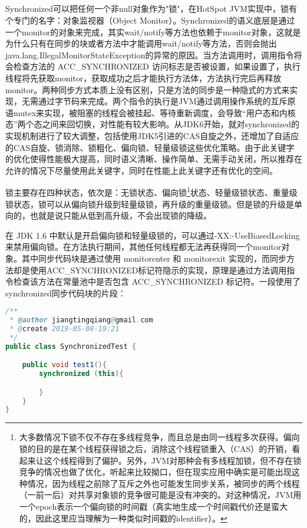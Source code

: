 \documentclass[../../../interview-questions.tex]{subfiles}
\begin{document}
\subsection{\color{red}{synchronized的实现原理是什么}}

Synchronized可以把任何一个非null对象作为"锁"，在HotSpot JVM实现中，锁有个专门的名字：对象监视器（Object Monitor）。Synchronized的语义底层是通过一个monitor的对象来完成，其实wait/notify等方法也依赖于monitor对象，这就是为什么只有在同步的块或者方法中才能调用wait/notify等方法，否则会抛出java.lang.IllegalMonitorStateException的异常的原因。当方法调用时，调用指令将会检查方法的 ACC\_SYNCHRONIZED 访问标志是否被设置，如果设置了，执行线程将先获取monitor，获取成功之后才能执行方法体，方法执行完后再释放monitor。两种同步方式本质上没有区别，只是方法的同步是一种隐式的方式来实现，无需通过字节码来完成。两个指令的执行是JVM通过调用操作系统的互斥原语mutex来实现，被阻塞的线程会被挂起、等待重新调度，会导致“用户态和内核态”两个态之间来回切换，对性能有较大影响。从JDK6开始，就对synchronized的实现机制进行了较大调整，包括使用JDK5引进的CAS自旋之外，还增加了自适应的CAS自旋、锁消除、锁粗化、偏向锁、轻量级锁这些优化策略。由于此关键字的优化使得性能极大提高，同时语义清晰、操作简单、无需手动关闭，所以推荐在允许的情况下尽量使用此关键字，同时在性能上此关键字还有优化的空间。

锁主要存在四种状态，依次是：无锁状态、偏向锁\footnote{大多数情况下锁不仅不存在多线程竞争，而且总是由同一线程多次获得。偏向锁的目的是在某个线程获得锁之后，消除这个线程锁重入（CAS）的开销，看起来让这个线程得到了偏护。另外，JVM对那种会有多线程加锁，但不存在锁竞争的情况也做了优化，听起来比较拗口，但在现实应用中确实是可能出现这种情况，因为线程之前除了互斥之外也可能发生同步关系，被同步的两个线程（一前一后）对共享对象锁的竞争很可能是没有冲突的。对这种情况，JVM用一个epoch表示一个偏向锁的时间戳（真实地生成一个时间戳代价还是蛮大的，因此这里应当理解为一种类似时间戳的identifier）。}状态、轻量级锁状态、重量级锁状态，锁可以从偏向锁升级到轻量级锁，再升级的重量级锁。但是锁的升级是单向的，也就是说只能从低到高升级，不会出现锁的降级。

在 JDK 1.6 中默认是开启偏向锁和轻量级锁的，可以通过-XX:-UseBiasedLocking来禁用偏向锁。在方法执行期间，其他任何线程都无法再获得同一个monitor对象。其中同步代码块是通过使用 monitorenter 和 monitorexit 实现的，而同步方法却是使用ACC\_SYNCHRONIZED标记符隐示的实现，原理是通过方法调用指令检查该方法在常量池中是否包含 ACC\_SYNCHRONIZED 标记符。一段使用了synchronized同步代码块的片段：

\begin{lstlisting}[language=Java]
/**
 * @author jiangtingqiang@gmail.com
 * @create 2019-05-08-19:21
 */
public class SynchronizedTest {

    public void test1(){
        synchronized (this){

        }
    }
}
\end{lstlisting}
\end{document}
